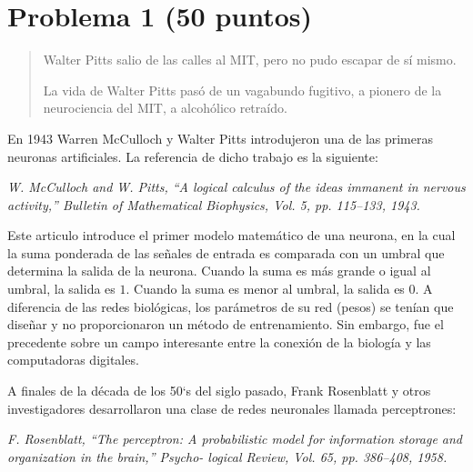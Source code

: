 \documentclass[10pt]{article}
\begin{document}
\section*{Problema 1 (50 puntos)}\label{sec-problema-1-50-puntos}%

\begin{quote}%

\noindent{}Walter Pitts salio de las calles al MIT, pero no pudo escapar de sí mismo. \mdbr
{}\hspace*{1em}%

 La vida de Walter Pitts pasó de un vagabundo fugitivo, a pionero de la neurociencia del MIT, a alcohólico retraído.%
\end{quote}%

\noindent{}En 1943 Warren McCulloch y Walter Pitts introdujeron una de las primeras neuronas artificiales. La referencia de dicho trabajo es la siguiente:%

\emph{W. McCulloch and W. Pitts, “A logical calculus of the ideas immanent in nervous activity,” Bulletin of Mathematical Biophysics, Vol. 5, pp. 115–133, 1943.}%

Este articulo introduce el primer modelo matemático de una neurona, en la cual la suma ponderada de las señales de entrada es comparada con un umbral que determina la salida de la neurona. Cuando la suma es más grande o igual al umbral, la salida es $1$. Cuando la suma es menor al umbral, la salida es $0$. A diferencia de las redes biológicas, los parámetros de su red (pesos) se tenían que diseñar y no proporcionaron un método de entrenamiento. Sin embargo, fue el precedente sobre un campo interesante entre la conexión de la biología y las computadoras digitales.%

A finales de la década de los 50`s del siglo pasado, Frank Rosenblatt y otros investigadores desarrollaron una clase de redes neuronales llamada perceptrones:%

\emph{F. Rosenblatt, “The perceptron: A probabilistic model for information storage and organization in the brain,” Psycho- logical Review, Vol. 65, pp. 386–408, 1958.}%
\end{document}
